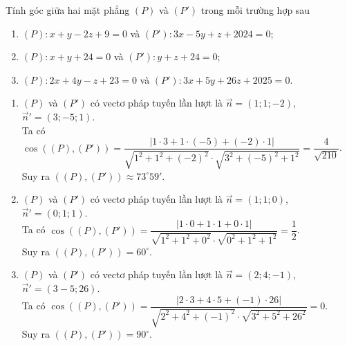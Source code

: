 \begin{vd}%
	Tính góc giữa hai mặt phẳng $(P)$ và $(P')$ trong mỗi trường hợp sau
	\begin{enumerate}
		\item $(P)\colon x+y-2z+9=0$ và $(P')\colon 3x-5y+z+2024=0$;
		\item $(P)\colon x+y+24=0$ và $(P')\colon y+z+24=0$;
		\item $(P)\colon 2x+4y-z+23=0$ và $(P')\colon 3x+5y+26z+2025=0$.
	\end{enumerate}
	\loigiai
	{
		\begin{enumerate}
			\item $(P)$ và $(P')$ có vectơ pháp tuyến lần lượt là $\overrightarrow{n}=(1;1;-2)$, $\overrightarrow{n}'=(3;-5;1)$.\\
			Ta có $\cos\left ((P),(P') \right )=\dfrac{\left |1\cdot 3+1\cdot (-5)+(-2)\cdot 1 \right |}{\sqrt{1^2+1^2+(-2)^2}\cdot\sqrt{3^2+(-5)^2+1^2}}=\dfrac{4}{\sqrt{210}}$.\\
			Suy ra $((P),(P'))\approx 73^{\circ}59'$.
			\item $(P)$ và $(P')$ có vectơ pháp tuyến lần lượt là $\overrightarrow{n}=(1;1;0)$, $\overrightarrow{n}'=(0;1;1)$.\\
			Ta có $\cos\left ((P),(P') \right )=\dfrac{\left |1\cdot 0+1\cdot 1+0\cdot 1 \right |}{\sqrt{1^2+1^2+0^2}\cdot\sqrt{0^2+1^2+1^2}}=\dfrac{1}{2}$.\\
			Suy ra $((P),(P'))=60^{\circ}$.
			\item $(P)$ và $(P')$ có vectơ pháp tuyến lần lượt là $\overrightarrow{n}=(2;4;-1)$, $\overrightarrow{n}'=(3-5;26)$.\\
			Ta có $\cos\left ((P),(P') \right )=\dfrac{\left |2\cdot 3+4\cdot 5+(-1)\cdot 26 \right |}{\sqrt{2^2+4^2+(-1)^2}\cdot\sqrt{3^2+5^2+26^2}}=0$.\\
			Suy ra $((P),(P'))=90^{\circ}$.
		\end{enumerate}
	}
\end{vd}

